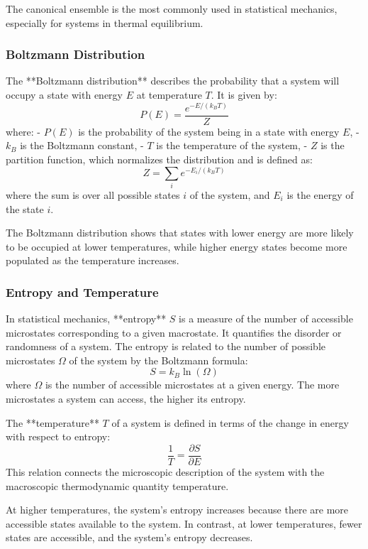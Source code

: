 \documentclass{article}
\begin{document}
The canonical ensemble is the most commonly used in statistical mechanics, especially for systems in thermal equilibrium.

\subsubsection*{Boltzmann Distribution}

The **Boltzmann distribution** describes the probability that a system will occupy a state with energy \( E \) at temperature \( T \). It is given by:
\[
P(E) = \frac{e^{-E/(k_B T)}}{Z}
\]
where:
- \( P(E) \) is the probability of the system being in a state with energy \( E \),
- \( k_B \) is the Boltzmann constant,
- \( T \) is the temperature of the system,
- \( Z \) is the partition function, which normalizes the distribution and is defined as:
\[
Z = \sum_{i} e^{-E_i/(k_B T)}
\]
where the sum is over all possible states \( i \) of the system, and \( E_i \) is the energy of the state \( i \).

The Boltzmann distribution shows that states with lower energy are more likely to be occupied at lower temperatures, while higher energy states become more populated as the temperature increases.

\subsubsection*{Entropy and Temperature}

In statistical mechanics, **entropy** \( S \) is a measure of the number of accessible microstates corresponding to a given macrostate. It quantifies the disorder or randomness of a system. The entropy is related to the number of possible microstates \( \Omega \) of the system by the Boltzmann formula:
\[
S = k_B \ln(\Omega)
\]
where \( \Omega \) is the number of accessible microstates at a given energy. The more microstates a system can access, the higher its entropy.

The **temperature** \( T \) of a system is defined in terms of the change in energy with respect to entropy:
\[
\frac{1}{T} = \frac{\partial S}{\partial E}
\]
This relation connects the microscopic description of the system with the macroscopic thermodynamic quantity temperature.

At higher temperatures, the system's entropy increases because there are more accessible states available to the system. In contrast, at lower temperatures, fewer states are accessible, and the system's entropy decreases.
\end{document}
